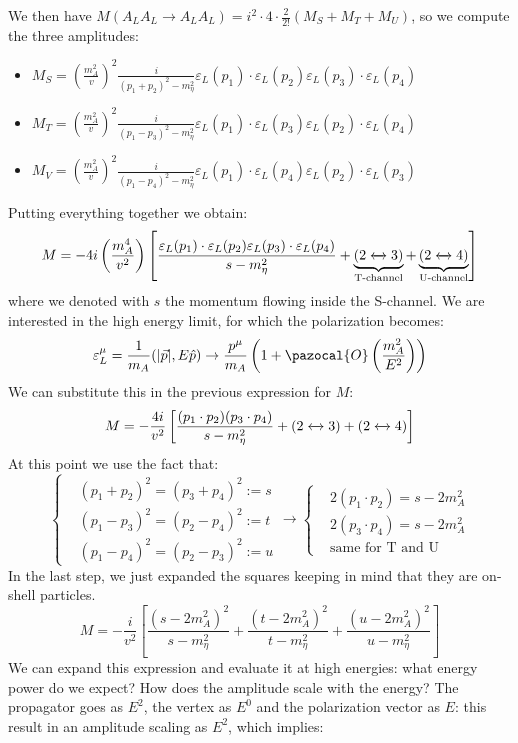 \documentclass[../main.tex]{subfiles}
\begin{document}
We then have $M(A_LA_L\to A_LA_L)=i^2\cdot4\cdot\frac{2}{2!}(M_S+M_T+M_U)$, so we compute the three amplitudes:
\begin{itemize}
    \item $M_S=\left(\frac{m_A^2}{v}\right)^2\frac{i}{(p_1+p_2)^2-m_\eta^2}\varepsilon_L(p_1)\cdot\varepsilon_L(p_2)\varepsilon_L(p_3)\cdot\varepsilon_L(p_4)$
    \item $M_T=\left(\frac{m_A^2}{v}\right)^2\frac{i}{(p_1-p_3)^2-m_\eta^2}\varepsilon_L(p_1)\cdot\varepsilon_L(p_3)\varepsilon_L(p_2)\cdot\varepsilon_L(p_4)$
    \item $M_V=\left(\frac{m_A^2}{v}\right)^2\frac{i}{(p_1-p_4)^2-m_\eta^2}\varepsilon_L(p_1)\cdot\varepsilon_L(p_4)\varepsilon_L(p_2)\cdot\varepsilon_L(p_3)$
\end{itemize}
Putting everything together we obtain:
\[
M=-4i\left(\frac{m_A^4}{v^2}\right)\left[\frac{\varepsilon_L(p_1)\cdot\varepsilon_L(p_2)\varepsilon_L(p_3)\cdot\varepsilon_L(p_4)}{s-m_\eta^2}+\underbrace{(2\xleftrightarrow[]{}3)}_{\text{T-channel}}+\underbrace{(2\xleftrightarrow[]{}4)}_{\text{U-channel}}\right]
\]
where we denoted with $s$ the momentum flowing inside the S-channel. We are interested in the high energy limit, for which the polarization becomes:
\[
\varepsilon_L^\mu=\frac{1}{m_A}(|\Vec{p}|,E\hat{p})\to\frac{p^\mu}{m_A}\left(1+\pazocal{O}\left(\frac{m_A^2}{E^2}\right)\right)
\]
We can substitute this in the previous expression for $M$:
\[
M=-\frac{4i}{v^2}\left[\frac{(p_1\cdot p_2)(p_3\cdot p_4)}{s-m_\eta^2}+(2\xleftrightarrow[]{}3)+(2\xleftrightarrow[]{}4)\right]
\]
At this point we use the fact that:
\[
\left\{
\begin{aligned}
&(p_1+p_2)^2=(p_3+p_4)^2:=s\\
&(p_1-p_3)^2=(p_2-p_4)^2:=t\\
&(p_1-p_4)^2=(p_2-p_3)^2:=u
\end{aligned}
\right.
\to
\left\{
\begin{aligned}
&2(p_1\cdot p_2)=s-2m_A^2\\    
&2(p_3\cdot p_4)=s-2m_A^2\\
&\text{same for T and U}
\end{aligned}
\right.
\]
In the last step, we just expanded the squares keeping in mind that they are on-shell particles.
\[
M=-\frac{i}{v^2}\left[\frac{(s-2m_A^2)^2}{s-m_\eta^2}+\frac{(t-2m_A^2)^2}{t-m_\eta^2}+\frac{(u-2m_A^2)^2}{u-m_\eta^2}\right]
\]
We can expand this expression and evaluate it at high energies: what energy power do we expect? How does the amplitude scale with the energy? The propagator goes as $E^2$, the vertex as $E^0$ and the polarization vector as $E$: this result in an amplitude scaling as $E^2$, which implies:
\end{document}
